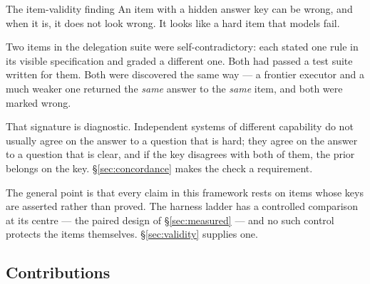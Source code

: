 \begin{cautionbox}{The item-validity finding}
An item with a hidden answer key can be wrong, and when it is, it does not look wrong. It looks like a hard item that models fail.

Two items in the delegation suite were self-contradictory: each stated one rule in its visible specification and graded a different one. Both had passed a test suite written for them. Both were discovered the same way --- a frontier executor and a much weaker one returned the \emph{same} answer to the \emph{same} item, and both were marked wrong.

That signature is diagnostic. Independent systems of different capability do not usually agree on the answer to a question that is hard; they agree on the answer to a question that is clear, and if the key disagrees with both of them, the prior belongs on the key. \S\ref{sec:concordance} makes the check a requirement.
\end{cautionbox}

The general point is that every claim in this framework rests on items whose keys are asserted rather than proved. The harness ladder has a controlled comparison at its centre --- the paired design of \S\ref{sec:measured} --- and no such control protects the items themselves. \S\ref{sec:validity} supplies one.

\subsection{Contributions}

